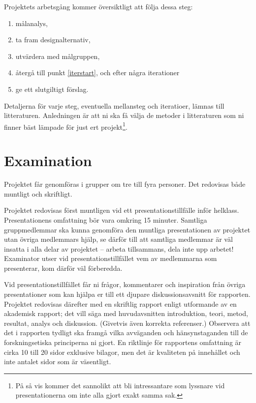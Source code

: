 \documentclass[a4paper,logo,nocourse]{miunasgn}
\begin{document}
Projektets arbetsgång kommer översiktligt att följa dessa steg:
\begin{enumerate}
  \item \label{iterstart} målanalys,
  \item ta fram designalternativ,
  \item utvärdera med målgruppen,
  \item återgå till punkt \ref{iterstart}, och efter några iterationer
  \item ge ett slutgiltigt förslag.
\end{enumerate}
Detaljerna för varje steg, eventuella mellansteg och iteratioer, lämnas till 
litteraturen.
Anledningen är att ni ska få välja de metoder i litteraturen som ni finner bäst 
lämpade för just ert projekt\footnote{%
	På så vis kommer det sannolikt att bli intressantare som lyssnare vid 
	presentationerna om inte alla gjort exakt samma sak.
}.


\section{Examination}
\label{sec:Examination}
Projektet får genomföras i grupper om tre till fyra personer.
Det redovisas både muntligt och skriftligt.

Projektet redovisas först muntligen vid ett presentationstillfälle inför 
helklass.
Presentationens omfattning bör vara omkring 15 minuter.
Samtliga gruppmedlemmar ska kunna genomföra den muntliga presentationen av 
projektet utan övriga medlemmars hjälp, se därför till att samtliga medlemmar 
är väl insatta i alla delar av projektet -- arbeta tillsammans, dela inte upp 
arbetet!
Examinator utser vid presentationstillfället vem av medlemmarna som 
presenterar, kom därför väl förberedda.

Vid presentationstillfället får ni frågor, kommentarer och inspiration från 
övriga presentationer som kan hjälpa er till ett djupare diskussionsavsnitt för 
rapporten.
Projektet redovisas därefter med en skriftlig rapport enligt utformande av en 
akademisk rapport; det vill säga med huvudavsnitten introduktion, teori, metod, 
resultat, analys och diskussion.
(Givetvis även korrekta referenser.)
Observera att det i rapporten tydligt ska framgå vilka avväganden och 
hänsynstaganden till de forskningsetiska principerna ni gjort.
En riktlinje för rapportens omfattning är cirka 10 till 20 sidor exklusive 
bilagor, men det är kvaliteten på innehållet och inte antalet sidor som är 
väsentligt.
\end{document}
